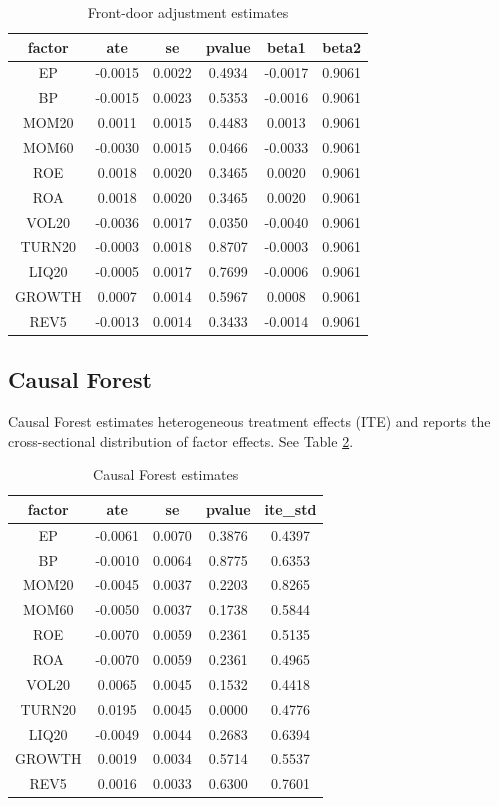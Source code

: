 \documentclass[12pt,a4paper]{article}
\begin{document}
\begin{table}[htbp]
\centering
\caption{Front-door adjustment estimates}
\label{tab:fd}
\begin{tabular}{cccccc}
\toprule
factor & ate & se & pvalue & beta1 & beta2 \\ 
\midrule
EP & -0.0015 & 0.0022 & 0.4934 & -0.0017 & 0.9061 \\ 
BP & -0.0015 & 0.0023 & 0.5353 & -0.0016 & 0.9061 \\ 
MOM20 & 0.0011 & 0.0015 & 0.4483 & 0.0013 & 0.9061 \\ 
MOM60 & -0.0030 & 0.0015 & 0.0466 & -0.0033 & 0.9061 \\ 
ROE & 0.0018 & 0.0020 & 0.3465 & 0.0020 & 0.9061 \\ 
ROA & 0.0018 & 0.0020 & 0.3465 & 0.0020 & 0.9061 \\ 
VOL20 & -0.0036 & 0.0017 & 0.0350 & -0.0040 & 0.9061 \\ 
TURN20 & -0.0003 & 0.0018 & 0.8707 & -0.0003 & 0.9061 \\ 
LIQ20 & -0.0005 & 0.0017 & 0.7699 & -0.0006 & 0.9061 \\ 
GROWTH & 0.0007 & 0.0014 & 0.5967 & 0.0008 & 0.9061 \\ 
REV5 & -0.0013 & 0.0014 & 0.3433 & -0.0014 & 0.9061 \\ 
\bottomrule
\end{tabular}
\end{table}

\subsection{Causal Forest}
Causal Forest estimates heterogeneous treatment effects (ITE) and reports the cross-sectional distribution of factor effects. See Table \ref{tab:cf}.

\begin{table}[htbp]
\centering
\caption{Causal Forest estimates}
\label{tab:cf}
\begin{tabular}{ccccc}
\toprule
factor & ate & se & pvalue & ite\_std \\ 
\midrule
EP & -0.0061 & 0.0070 & 0.3876 & 0.4397 \\ 
BP & -0.0010 & 0.0064 & 0.8775 & 0.6353 \\ 
MOM20 & -0.0045 & 0.0037 & 0.2203 & 0.8265 \\ 
MOM60 & -0.0050 & 0.0037 & 0.1738 & 0.5844 \\ 
ROE & -0.0070 & 0.0059 & 0.2361 & 0.5135 \\ 
ROA & -0.0070 & 0.0059 & 0.2361 & 0.4965 \\ 
VOL20 & 0.0065 & 0.0045 & 0.1532 & 0.4418 \\ 
TURN20 & 0.0195 & 0.0045 & 0.0000 & 0.4776 \\ 
LIQ20 & -0.0049 & 0.0044 & 0.2683 & 0.6394 \\ 
GROWTH & 0.0019 & 0.0034 & 0.5714 & 0.5537 \\ 
REV5 & 0.0016 & 0.0033 & 0.6300 & 0.7601 \\ 
\bottomrule
\end{tabular}
\end{table}
\end{document}
